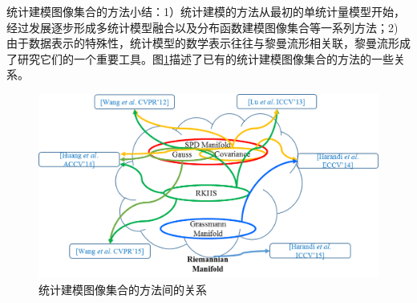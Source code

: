 统计建模图像集合的方法小结：1）统计建模的方法从最初的单统计量模型开始，经过发展逐步形成多统计模型融合以及分布函数建模图像集合等一系列方法；2) 由于数据表示的特殊性，统计模型的数学表示往往与黎曼流形相关联，黎曼流形成了研究它们的一个重要工具。图\ref{fig:Statistics_relation}描述了已有的统计建模图像集合的方法的一些关系。
\begin{figure}[h]
	\centering
	\includegraphics[width=0.7\linewidth]{source/Statistics_relation.png}
	\caption{统计建模图像集合的方法间的关系}
	\label{fig:Statistics_relation}
\end{figure}
